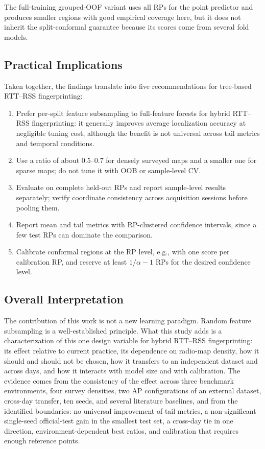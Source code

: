 The full-training grouped-OOF variant uses all RPs for the point predictor and produces smaller regions with good empirical coverage here, but it does not inherit the split-conformal guarantee because its scores come from several fold models.

\subsection{Practical Implications}
\label{subsec:discussion_practical}

Taken together, the findings translate into five recommendations for tree-based RTT--RSS fingerprinting:

\begin{enumerate}
	\item Prefer per-split feature subsampling to full-feature forests for hybrid RTT--RSS fingerprinting: it generally improves average localization accuracy at negligible tuning cost, although the benefit is not universal across tail metrics and temporal conditions.
	\item Use a ratio of about $0.5$--$0.7$ for densely surveyed maps and a smaller one for sparse maps; do not tune it with OOB or sample-level CV.
	\item Evaluate on complete held-out RPs and report sample-level results separately; verify coordinate consistency across acquisition sessions before pooling them.
	\item Report mean and tail metrics with RP-clustered confidence intervals, since a few test RPs can dominate the comparison.
	\item Calibrate conformal regions at the RP level, e.g., with one score per calibration RP, and reserve at least $1/\alpha-1$ RPs for the desired confidence level.
\end{enumerate}

\subsection{Overall Interpretation}
\label{subsec:discussion_overall}

The contribution of this work is not a new learning paradigm. Random feature subsampling is a well-established principle. What this study adds is a characterization of this one design variable for hybrid RTT--RSS fingerprinting: its effect relative to current practice, its dependence on radio-map density, how it should and should not be chosen, how it transfers to an independent dataset and across days, and how it interacts with model size and with calibration. The evidence comes from the consistency of the effect across three benchmark environments, four survey densities, two AP configurations of an external dataset, cross-day transfer, ten seeds, and several literature baselines, and from the identified boundaries: no universal improvement of tail metrics, a non-significant single-seed official-test gain in the smallest test set, a cross-day tie in one direction, environment-dependent best ratios, and calibration that requires enough reference points.
